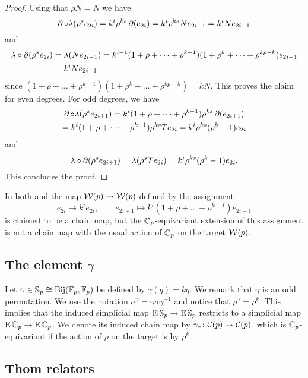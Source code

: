 \begin{proof}
	Using that $\rho N = N$ we have
	\[
	\operatorname{\partial} \mathbin{\circ} \lambda(\rho^s e_{2i}) = k^i \rho^{ks} \operatorname{\partial} (e_{2i}) = k^i \rho^{ks} N e_{2i-1} = k^i N e_{2i-1}
	\]
	and
	\begin{align*}
		\lambda \mathbin{\circ} \operatorname{\partial}(\rho^s e_{2i}) &= \lambda(N e_{2i-1}) = k^{i-1}(1+\rho+\dots+\rho^{k-1}) (1+\rho^k+\dots+\rho^{kp-k}) e_{2i-1} \\ &=
		k^i N e_{2i-1}
	\end{align*}
	since $(1+\rho+\dots+\rho^{k-1}) (1+\rho^k+\dots+\rho^{kp-k}) = kN$.
	This proves the claim for even degrees.
	For odd degrees, we have
	\begin{multline*}
		\operatorname{\partial} \mathbin{\circ} \lambda(\rho^s e_{2i+1}) = k^i (1+\rho+\dots+\rho^{k-1}) \rho^{ks} \operatorname{\partial} (e_{2i+1}) \\
		= k^i (1+\rho+\dots+\rho^{k-1}) \rho^{ks} T e_{2i} = k^i \rho^{ks} (\rho^k-1) e_{2i}
	\end{multline*}
	and
	\[
	\lambda \mathbin{\circ} \operatorname{\partial}(\rho^s e_{2i+1}) = \lambda(\rho^s T e_{2i}) = k^i\rho^{ks}(\rho^k-1) e_{2i}.
	\]
	This concludes the proof.
\end{proof}

\begin{remark*}
	In both \cite[p.219]{steenrod1953cyclic} and \cite[p.159]{may1970general} the map $\mathcal{W}(p) \to \mathcal{W}(p)$ defined by the assignment
	\[
	e_{2i} \mapsto k^i e_{2i}, \qquad
	e_{2i+1} \mapsto k^i (1+\rho+\dots+\rho^{k-1}) e_{2i+1}
	\]
	is claimed to be a chain map, but the $\mathbb{C}_p$-equivariant extension of this assignment is not a chain map with the usual action of $\mathbb{C}_p$ on the target $\mathcal{W}(p)$.
\end{remark*}

\subsection{The element $\gamma$}

Let $\gamma \in \mathbb{S}_p \cong \mathrm{Bij}({\mathbb{F}_p}, {\mathbb{F}_p})$ be defined by $\gamma(q) = kq$.
We remark that $\gamma$ is an odd permutation.
We use the notation $\sigma^\gamma = \gamma \sigma \gamma^{-1}$
and notice that $\rho^\gamma = \rho^k$.
This implies that the induced simplicial map $\operatorname{E}\mathbb{S}_p \to \operatorname{E}\mathbb{S}_p$ restricts to a simplicial map $\operatorname{E}\mathbb{C}_p \to \operatorname{E}\mathbb{C}_p$.
We denote its induced chain map by $\gamma_\ast \colon \mathcal{C}(p) \to \mathcal{C}(p)$, which is $\mathbb{C}_p$-equivariant if the action of $\rho$ on the target is by $\rho^k$.

\subsection{Thom relators}

